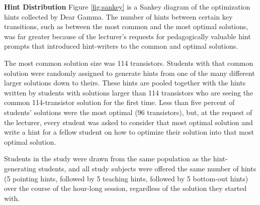 {\bf Hint Distribution} Figure \ref{fig:sankey} is a Sankey diagram of the optimization hints collected by Dear Gamma. The number of hints between certain key transitions, such as between the most common and the most optimal solutions, was far greater because of the lecturer's requests for pedagogically valuable hint prompts that introduced hint-writers to the common and optimal solutions. 

The most common solution size was 114 transistors. Students with that common solution were randomly assigned to generate hints from one of the many different larger solutions down to theirs. These hints are pooled together with the hints written by students with solutions larger than 114 transistors who are seeing the common 114-transistor solution for the first time. Less than five percent of students' solutions were the most optimal (96 transistors), but, at the request of the lecturer, every student was asked to consider that most optimal solution and write a hint for a fellow student on how to optimize their solution into that most optimal solution.

Students in the study were drawn from the same population as the hint-generating students, and all study subjects were offered the same number of hints (5 pointing hints, followed by 5 teaching hints, followed by 5 bottom-out hints) over the course of the hour-long session, regardless of the solution they started with. 

